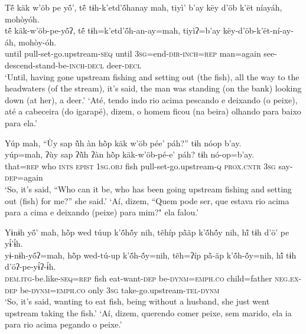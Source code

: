 \documentclass[output=paper,
modfonts,nonflat
]{langsci/langscibook}
\begin{document}
\newpage
\ea  Të́ käk w’öb pe yö́’, të́ tɨh-k’etd’ö́hanay mah, tiyì’ b’ay këy d’öb k’ët níayáh, mohòyóh.\\ 
\gll të́ käk-w’öb-pe-yö́ʔ, të́ tɨh=k’etd’ö́h-an-ay=mah, tiyìʔ=b’ay këy-d’öb-k’ët-ní-ay-áh, mohòy-óh.\\
     until pull-set-go.upstream\textsc{-seq} until \textsc{3sg=}end\textsc{-dir-inch=rep} man=again see-descend-stand-be\textsc{-inch-decl} deer\textsc{-decl}\\
\glt ‘Until, having gone upstream fishing and setting out (the fish), all the way to the headwaters (of the stream), it’s said, the man was standing (on the bank) looking down (at her), a deer.'
\glt ‘Até, tendo indo rio acima pescando e deixando (o peixe), até a cabeceira (do igarapé), dizem, o homem ficou (na beira) olhando para baixo para ela.'
\z 

\ea  Yúp mah, “Ùy sap ũ̀h àn hõ̀p käk w’öb pée’ páh?” tɨh nóop b’ay.\\ 
\gll yúp=mah, ʔùy sap ʔũ̀h ʔàn hõ̀p käk-w’öb-pé-e’ páh? tɨh nó-op=b’ay.\\
     that\textsc{=rep} who \textsc{ints} \textsc{epist} \textsc{1sg.obj} fish pull-set-go.upstream\textsc{-q} \textsc{prox.cntr} \textsc{3sg} say\textsc{-dep=}again\\
\glt ‘So, it’s said, “Who can it be, who has been going upstream fishing and setting out (fish) for me?” she said.'
\glt ‘Aí, dizem, “Quem pode ser, que estava rio acima para a cima e deixando (peixe) para mim?" ela falou.'
\z 

\ea  Yɨnɨh yö́’ mah, hõ̀p wed túup k’ṍhṍy nih, tẽhíp pã̀ãp k’ṍhṍy nih, hĩ́ tɨh d’ö’ pe yɨ́’ɨ́h.\\ 
\gll yɨ-nɨh-yö́ʔ=mah, hõ̀p wed-tú-up k’ṍh-ṍy=nih, tẽh=ʔíp pã̀-ãp k’ṍh-ṍy=nih, hĩ́ tɨh d’öʔ-pe-yɨ́ʔ-ɨ́h.\\
     \textsc{dem.itg-}be.like\textsc{-seq=rep} fish eat-want\textsc{-dep} be\textsc{-dynm=emph.co} child=father \textsc{neg.ex-dep} be\textsc{-dynm=emph.co} only \textsc{3sg} take-go.upstream\textsc{-tel-dynm}\\
\glt ‘So, it’s said, wanting to eat fish, being without a husband, she just went upstream taking the fish.'{\footnotemark}
\glt ‘Aí, dizem, querendo comer peixe, sem marido, ela ia para rio acima pegando o peixe.'
\z 
\end{document}
